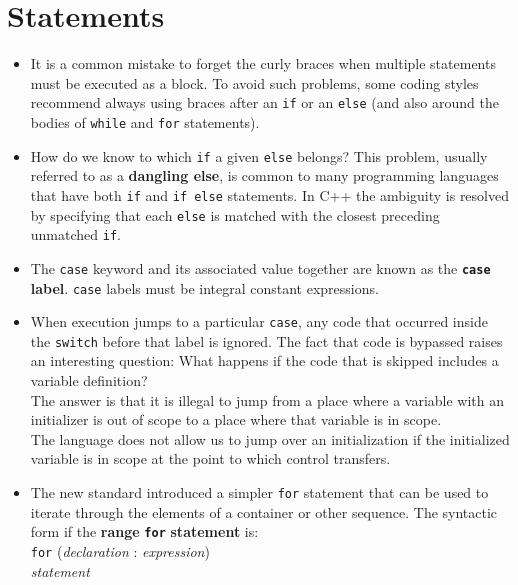 \section{Statements}
\begin{itemize}

\item
It is a common mistake to forget the curly braces when multiple statements must be executed as a block. To avoid such problems, some coding styles recommend always using braces after an \texttt{if} or an \texttt{else} (and also around the bodies of \texttt{while} and \texttt{for} statements).

\item
How do we know to which \texttt{if} a given \texttt{else} belongs? This problem, usually referred to as a \textbf{dangling else}, is common to many programming languages that have both \texttt{if} and \texttt{if else} statements. In C++ the ambiguity is resolved by specifying that each \texttt{else} is matched with the closest preceding unmatched \texttt{if}.

\item
The \texttt{case} keyword and its associated value together are known as the \texttt{\textbf{case}} \textbf{label}. \texttt{case} labels must be integral constant expressions.

\item
When execution jumps to a particular \texttt{case}, any code that occurred inside the \texttt{switch} before that label is ignored. The fact that code is bypassed raises an interesting question: What happens if the code that is skipped includes a variable definition?\\
The answer is that it is illegal to jump from a place where a variable with an initializer is out of scope to a place where that variable is in scope.\\
The language does not allow us to jump over an initialization if the initialized variable is in scope at the point to which control transfers.

\item
The new standard introduced a simpler \texttt{for} statement that can be used to iterate through the elements of a container or other sequence. The syntactic form if the \textbf{range} \texttt{\textbf{for}} \textbf{statement} is:\\
\hspace*{1em}\texttt{for} (\textit{declaration} : \textit{expression})\\
\hspace*{3em}\textit{statement}


\end{itemize}
